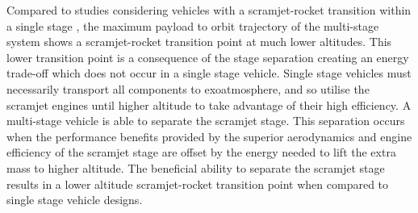 \documentclass[]{aiaa-tc}
\begin{document}
 
 Compared to studies considering vehicles with a scramjet-rocket transition within a single stage \cite{Lu1993}\cite{Trefny1999}, the maximum payload to orbit trajectory of the multi-stage system shows a scramjet-rocket transition point at much lower altitudes.
 This lower transition point is a consequence of the stage separation creating an energy trade-off which does not occur in a single stage vehicle. Single stage vehicles must necessarily transport all components to exoatmosphere, and so utilise the scramjet engines until higher altitude to take advantage of their high efficiency. A multi-stage vehicle is able to separate the scramjet stage. 
This separation occurs when the performance benefits provided by the superior aerodynamics and engine efficiency of the scramjet stage are offset by the energy needed to lift the extra mass to higher altitude. The beneficial ability
to separate the scramjet stage results in a lower altitude scramjet-rocket transition point when compared to single
stage vehicle designs.
\end{document}
